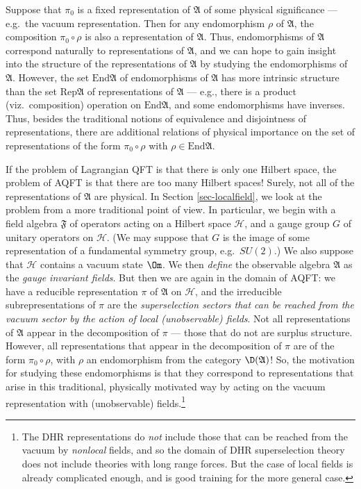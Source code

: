 \documentclass[12pt]{article}
\newcommand{\alg}[1]{\mathfrak{#1}}
\theoremstyle{definition}
\theoremstyle{definition}
\theoremstyle{remark}
\def\2#1{{\mathcal #1}}
\def\al#1{{\mathfrak #1}}
\newcommand{\End}{\mathrm{End}}
\newcommand{\Rep}{\mathrm{Rep}}
\begin{document}
Suppose that $\pi _0$ is a fixed representation of $\al A$ of some
physical significance --- e.g.\ the vacuum representation.  Then for
any endomorphism $\rho$ of $\al A$, the composition $\pi _0\circ \rho$
is also a representation of $\al A$.  Thus, endomorphisms of $\alg{A}$
correspond naturally to representations of $\alg{A}$, and we can hope
to gain insight into the structure of the representations of $\alg{A}$
by studying the endomorphisms of $\al A$.  However, the set $\End \al
A$ of endomorphisms of $\al A$ has more intrinsic structure than the
set $\Rep \alg{A}$ of representations of $\alg{A}$ --- e.g., there is
a product (viz.\ composition) operation on $\End \al A$, and some
endomorphisms have inverses.  Thus, besides the traditional notions of
equivalence and disjointness of representations, there are additional
relations of physical importance on the set of representations of the
form $\pi _0\circ \rho$ with $\rho \in
\End \alg{A}$.

If the problem of Lagrangian QFT is that there is only one Hilbert
space, the problem of AQFT is that there are too many Hilbert spaces!
Surely, not all of the representations of $\alg{A}$ are physical.  In
Section \ref{sec-localfield}, we look at the problem from a more
traditional point of view.  In particular, we begin with a field
algebra $\alg{F}$ of operators acting on a Hilbert space $\2H$, and a
gauge group $G$ of unitary operators on $\2H$.  (We may suppose that
$G$ is the image of some representation of a fundamental symmetry
group, e.g.\ $SU(2)$.)  We also suppose that $\2H$ contains a vacuum
state $\Om$.  We then \emph{define} the observable algebra $\alg{A}$
as the \emph{gauge invariant fields}.  But then we are again in the
domain of AQFT: we have a reducible representation $\pi$ of $\al A$ on
$\2H$, and the irreducible subrepresentations of $\pi$ are the
\emph{superselection sectors that can be reached from the vacuum
  sector by the action of local (unobservable) fields}.  Not all
representations of $\alg{A}$ appear in the decomposition of $\pi$ ---
those that do not are surplus structure.  However, all representations
that appear in the decomposition of $\pi$ are of the form $\pi _0\circ
\rho$, with $\rho$ an endomorphism from the category $\D (\al A)$!
So, the motivation for studying these endomorphisms is that they
correspond to representations that arise in this traditional,
physically motivated way by acting on the vacuum representation with
(unobservable) fields.\footnote{The DHR representations do \emph{not}
  include those that can be reached from the vacuum by \emph{nonlocal}
  fields, and so the domain of DHR superselection theory does not
  include theories with long range forces.  But the case of local
  fields is already complicated enough, and is good training for the
  more general case.}
\end{document}
